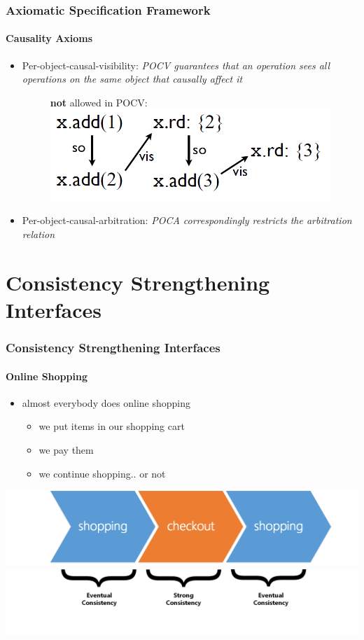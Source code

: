 \documentclass[11pt]{beamer}
\begin{document}
\begin{frame}
\frametitle{Axiomatic Specification Framework}
\framesubtitle{Causality Axioms}
\begin{itemize}
\item Per-object-causal-visibility:
\textit{POCV guarantees that an operation sees all operations
on the same object that causally affect it}
\pause
\begin{center}
\begin{figure}
\textbf{not} allowed in POCV:
\includegraphics[scale=0.4]{pocv.png}
\end{figure}
\end{center}
\pause
\item Per-object-causal-arbitration:
\textit{POCA correspondingly
restricts the arbitration relation}
\end{itemize}
\end{frame}

\section{Consistency Strengthening Interfaces}

\begin{frame}
\frametitle{Consistency Strengthening Interfaces}
\framesubtitle{Online Shopping}
\begin{itemize}
\item almost everybody does online shopping
\begin{itemize}
\item we put items in our shopping cart
\item we pay them
\item we continue shopping.. or not
\end{itemize}
\end{itemize}
\pause
\includegraphics[scale=0.25]{shopping_example.png} \linebreak
\pause
\includegraphics[scale=0.25]{shopping_example_lower.png}
\end{frame}
\end{document}
